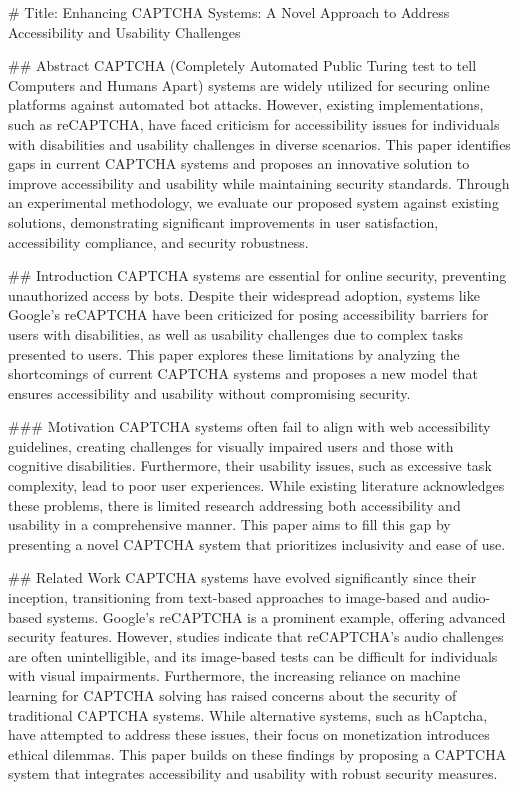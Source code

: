 # Title: Enhancing CAPTCHA Systems: A Novel Approach to Address Accessibility and Usability Challenges

## Abstract
CAPTCHA (Completely Automated Public Turing test to tell Computers and Humans Apart) systems are widely utilized for securing online platforms against automated bot attacks. However, existing implementations, such as reCAPTCHA, have faced criticism for accessibility issues for individuals with disabilities and usability challenges in diverse scenarios. This paper identifies gaps in current CAPTCHA systems and proposes an innovative solution to improve accessibility and usability while maintaining security standards. Through an experimental methodology, we evaluate our proposed system against existing solutions, demonstrating significant improvements in user satisfaction, accessibility compliance, and security robustness.

## Introduction
CAPTCHA systems are essential for online security, preventing unauthorized access by bots. Despite their widespread adoption, systems like Google's reCAPTCHA have been criticized for posing accessibility barriers for users with disabilities, as well as usability challenges due to complex tasks presented to users. This paper explores these limitations by analyzing the shortcomings of current CAPTCHA systems and proposes a new model that ensures accessibility and usability without compromising security.

### Motivation
CAPTCHA systems often fail to align with web accessibility guidelines, creating challenges for visually impaired users and those with cognitive disabilities. Furthermore, their usability issues, such as excessive task complexity, lead to poor user experiences. While existing literature acknowledges these problems, there is limited research addressing both accessibility and usability in a comprehensive manner. This paper aims to fill this gap by presenting a novel CAPTCHA system that prioritizes inclusivity and ease of use.

## Related Work
CAPTCHA systems have evolved significantly since their inception, transitioning from text-based approaches to image-based and audio-based systems. Google's reCAPTCHA is a prominent example, offering advanced security features. However, studies indicate that reCAPTCHA's audio challenges are often unintelligible, and its image-based tests can be difficult for individuals with visual impairments. Furthermore, the increasing reliance on machine learning for CAPTCHA solving has raised concerns about the security of traditional CAPTCHA systems. While alternative systems, such as hCaptcha, have attempted to address these issues, their focus on monetization introduces ethical dilemmas. This paper builds on these findings by proposing a CAPTCHA system that integrates accessibility and usability with robust security measures.

